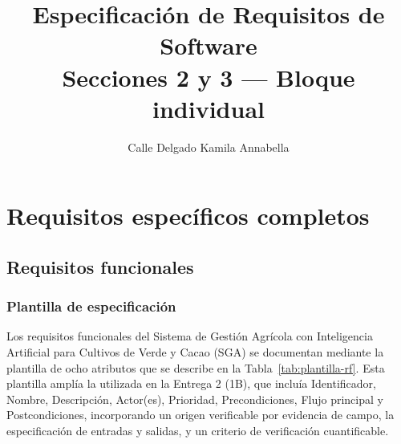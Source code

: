 \documentclass[12pt,a4paper]{article}
\title{Especificación de Requisitos de Software\\Secciones 2 y 3 --- Bloque individual}
\author{Calle Delgado Kamila Annabella}
\date{}
\begin{document}
\maketitle
\setcounter{section}{1}

\section{Requisitos específicos completos}
\label{sec:requisitos-especificos}

\subsection{Requisitos funcionales}
\label{sec:requisitos-funcionales}

\subsubsection{Plantilla de especificación}
\label{sec:plantilla-rf}

Los requisitos funcionales del Sistema de Gestión Agrícola con Inteligencia Artificial para Cultivos de Verde y Cacao (SGA) se documentan mediante la plantilla de ocho atributos que se describe en la Tabla~\ref{tab:plantilla-rf}. Esta plantilla amplía la utilizada en la Entrega 2 (1B), que incluía Identificador, Nombre, Descripción, Actor(es), Prioridad, Precondiciones, Flujo principal y Postcondiciones, incorporando un origen verificable por evidencia de campo, la especificación de entradas y salidas, y un criterio de verificación cuantificable.
\end{document}
